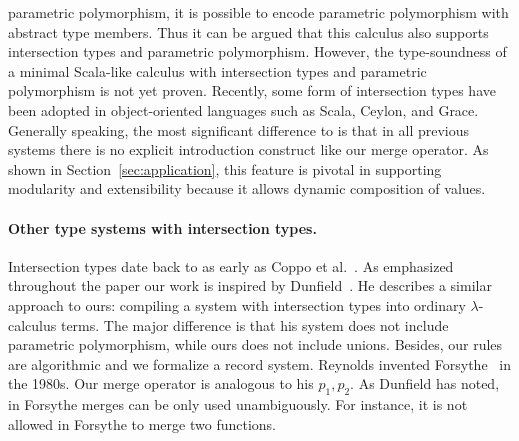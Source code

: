 parametric polymorphism, it is possible to encode parametric
polymorphism with abstract type members. Thus it can be argued that 
this calculus also supports intersection types and parametric
polymorphism. However, the type-soundness of a minimal Scala-like 
calculus with intersection types and parametric polymorphism is not
yet proven. Recently, some form of intersection
types have been adopted in object-oriented languages such as Scala,
Ceylon, and Grace. Generally speaking,
the most significant difference to \name is that in all previous systems
there is no explicit introduction construct like our merge operator. As shown in
Section~\ref{sec:application}, this feature is pivotal in supporting modularity
and extensibility because it allows dynamic composition of values.

\begin{comment}
only allow intersections of concrete types (classes),
whereas our language allows intersections of type variables, such as
\texttt{A \& B}. Without that vehicle, we would not be able to define
the generic \texttt{merge} function (below) for all interpretations of
a given algebra, and would incur boilerplate code:

\begin{lstlisting}{language=haskell}
let merge [A, B] (f: ExpAlg A) (g: ExpAlg B) = {
  lit (x : Int) = f.lit x ,, g.lit x,
  add (x : A & B) (y : A & B) =
    f.add x y ,, g.add x y
}
\end{lstlisting}
\end{comment}


\paragraph{Other type systems with intersection types.}
Intersection types date back to as early as Coppo et
al.~\cite{coppo1981functional}. As emphasized throughout the paper our 
work is inspired by Dunfield~\cite{dunfield2014elaborating}. He describes a similar approach to ours:
compiling a system with intersection types into ordinary $ \lambda $-calculus
terms. The major difference is that his system does not include parametric
polymorphism, while ours does not include unions. Besides, our rules are
algorithmic and we formalize a record system.
Reynolds invented Forsythe~\cite{reynolds1997design} in the 1980s. Our merge
operator is analogous to his $ p_1, p_2 $. As Dunfield
has noted, in Forsythe merges can be only used unambiguously. 
For instance, it is not allowed in Forsythe to merge two functions.

